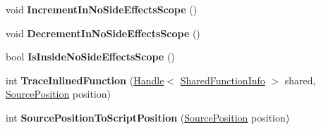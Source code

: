\begin{DoxyCompactItemize}
\item 
void {\bfseries Increment\+In\+No\+Side\+Effects\+Scope} ()\hypertarget{classv8_1_1internal_1_1_h_graph_a8da20bebb6d5d9d0e102f73454d812fc}{}\label{classv8_1_1internal_1_1_h_graph_a8da20bebb6d5d9d0e102f73454d812fc}

\item 
void {\bfseries Decrement\+In\+No\+Side\+Effects\+Scope} ()\hypertarget{classv8_1_1internal_1_1_h_graph_a636b695ae14df0aa15f9cb876f6d47a2}{}\label{classv8_1_1internal_1_1_h_graph_a636b695ae14df0aa15f9cb876f6d47a2}

\item 
bool {\bfseries Is\+Inside\+No\+Side\+Effects\+Scope} ()\hypertarget{classv8_1_1internal_1_1_h_graph_af0e72f1626fa8be53342f4dcd99ecdb6}{}\label{classv8_1_1internal_1_1_h_graph_af0e72f1626fa8be53342f4dcd99ecdb6}

\item 
int {\bfseries Trace\+Inlined\+Function} (\hyperlink{classv8_1_1internal_1_1_handle}{Handle}$<$ \hyperlink{classv8_1_1internal_1_1_shared_function_info}{Shared\+Function\+Info} $>$ shared, \hyperlink{classv8_1_1internal_1_1_source_position}{Source\+Position} position)\hypertarget{classv8_1_1internal_1_1_h_graph_a237f469eaee4e6a118154a6cd01b6974}{}\label{classv8_1_1internal_1_1_h_graph_a237f469eaee4e6a118154a6cd01b6974}

\item 
int {\bfseries Source\+Position\+To\+Script\+Position} (\hyperlink{classv8_1_1internal_1_1_source_position}{Source\+Position} position)\hypertarget{classv8_1_1internal_1_1_h_graph_aaa7585d172cb7c73f13a95685565f0bd}{}\label{classv8_1_1internal_1_1_h_graph_aaa7585d172cb7c73f13a95685565f0bd}

\end{DoxyCompactItemize}
